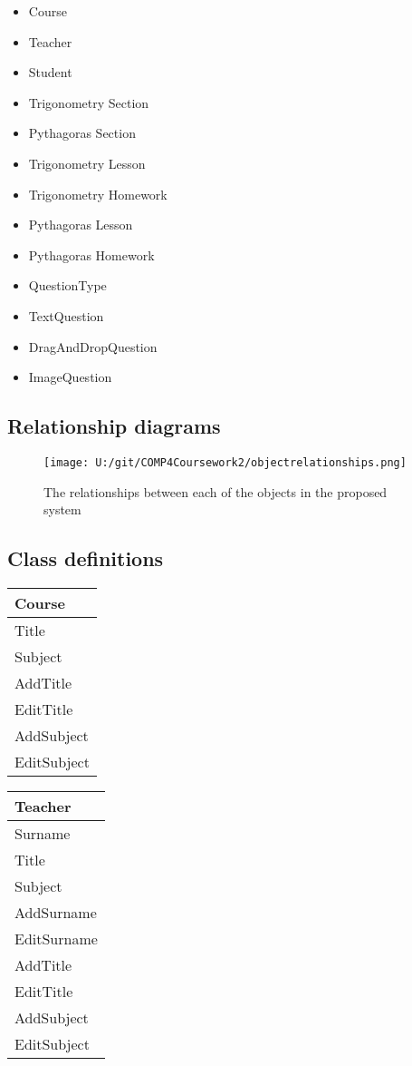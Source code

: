 \begin{itemize}
	\item Course
	\item Teacher
	\item Student
	\item Trigonometry Section
	\item Pythagoras Section
	\item Trigonometry Lesson
	\item Trigonometry Homework
	\item Pythagoras Lesson
	\item Pythagoras Homework
	\item QuestionType
	\item TextQuestion
	\item DragAndDropQuestion
	\item ImageQuestion
\end{itemize}

\subsection{Relationship diagrams}

\begin{figure}[H]
    \texttt{[image: U:/git/COMP4Coursework2/objectrelationships.png]}
    \caption{The relationships between each of the objects in the proposed system} \label{fig:print_function_result}
\end{figure}

\subsection{Class definitions}

\begin{center}
\begin{tabular}{|p{5cm}|} \hline
Course \\ \hline
Title \\
Subject \\ \hline
AddTitle \\ 
EditTitle \\
AddSubject \\
EditSubject \\ \hline
\end{tabular}
\end{center}

\begin{center}
\begin{tabular}{|p{5cm}|} \hline
Teacher \\ \hline
Surname \\
Title \\
Subject \\ \hline
AddSurname \\
EditSurname \\
AddTitle \\
EditTitle \\
AddSubject \\
EditSubject \\ \hline
\end{tabular}
\end{center}

